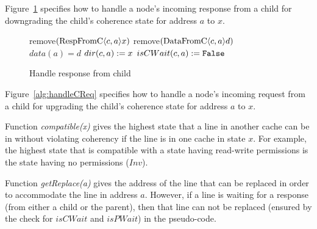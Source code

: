 Figure~\ref{alg:handleCResp} specifies how to handle a node's incoming response
from a child for downgrading the child's coherence state for address $a$ to $x$.

\begin{figure}
\begin{algorithmic}
  \State remove$(\text{RespFromC$\langle c,a\rangle$}{x})$
     \State remove$(\text{DataFromC$\langle c,a\rangle$}{d})$
     \State $data(a) = d$
  \EndIf
  \State $dir(c,a) := x$
    \State $isCWait(c, a) := \texttt{False}$
  \EndIf
\EndFunction
\end{algorithmic}
\caption{Handle response from child}
\label{alg:handleCResp}
\end{figure}

Figure~\ref{alg:handleCReq} specifies how to handle a node's incoming request
from a child for upgrading the child's coherence state for address $a$ to $x$.

Function \emph{compatible(x)} gives the highest state that a line in another
cache can be in without violating coherency if the line is in one cache in state
$x$. For example, the highest state that is compatible with a state having
read-write permissions is the state having no permissions (\ie $Inv$).

Function \emph{getReplace(a)} gives the address of the line that can be replaced
in order to accommodate the line in address $a$. However, if a line is waiting
for a response (from either a child or the parent), then that line can not be
replaced (ensured by the check for $isCWait$ and $isPWait$) in the pseudo-code.

